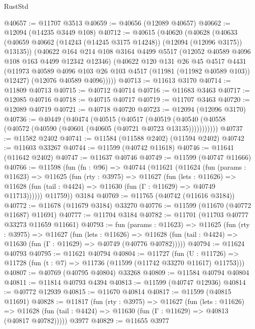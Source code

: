 \begin{lexlean}{RustStd}
\begin{coremodule}
@40657 := @11707 @3513
@40659 := @40656 (@12089 @40657)
@40662 := @12094 (@14235 @3449 @108)
@40712 := @40615
    (@40620
      (@40628
        (@40633 (@40659 @40662 (@14243 (@14245 @3175 @14248)) (@12094 (@12096 @3175)) @13135))
        (@40622
          @164
          @214
          @108
          @3164
          @4499
          @5517
          (@12052 @40589 @4096 @108 @163 @4499 @12342 @12346)
          (@40622
            @120
            @131
            @26
            @45
            @4517
            @4431
            (@11973 @40589 @4096 @103 @26 @103 @4517 (@11981 (@11982 @40589 @103)) @12427)
            (@12076 @40589 @4096)))))
@40713 := @11613 @3170
@40714 := @11809 @40713
@40715 := @40712 @40714
@40716 := @11683 @3463
@40717 := @12085 @40716
@40718 := @40715 @40717
@40719 := @11707 @3463
@40720 := @12089 @40719
@40721 := @40718 @40720
@40723 := @12094 (@12096 @3170)
@40736 := @40449
    (@40474
      (@40515
        (@40517
          (@40519 (@40540 (@40558 (@40572 (@40590 (@40601 (@40605 (@40721 @40723 @13135)))))))))))
@40737 := @11582 @2402
@40741 := @11584 (@11588 @2402) (@11594 @2402)
@40742 := @11603 @33267
@40744 := @11599 (@40742 @11618)
@40746 := @11641 (@11642 @2402)
@40747 := @11637 @40746
@40749 := @11599 (@40747 @11666)
@40766 := @11598
    (fun (fn : @96) =>
    @40744
      (@11621
        (@11624
          (fun (params : @11623) =>
          @11625
            (fun (rty : @3975) =>
            @11627
              (fun (lets : @11626) =>
              @11628 (fun (tail : @4424) => @11630 (fun (Γ : @11629) => @40749 @11713))))))
        @11759))
    @3184
@40769 := @11765 (@40742 (@11616 @3184))
@40772 := @11678 (@11679 @3184) @33270
@40776 := @11599 (@11670 (@40772 @11687) @11691)
@40777 := @11704 @3184
@40782 := @11701 (@11703 @40777 @33273 @11659 @11661)
@40793 := fun (params : @11623) =>
  @11625
    (fun (rty : @3975) =>
    @11627
      (fun (lets : @11626) =>
      @11628 (fun (tail : @4424) => @11630 (fun (Γ : @11629) => @40749 (@40776 @40782)))))
@40794 := @11624 @40793
@40795 := @11621 @40794
@40804 := @11727
    (fun (U : @11726) => @11728 (fun (t : @7) => @11736 (@11599 (@11742 @33270 @11617) @11753)))
@40807 := @40769 (@40795 @40804) @33268
@40809 := @11584 @40794 @40804
@40811 := @11814 @40793 @4394
@40813 := @11599 (@40747 @12936)
@40814 := @40772 @12939
@40815 := @11670 @40814
@40817 := @11599 (@40815 @11691)
@40828 := @11817
    (fun (rty : @3975) =>
    @11627
      (fun (lets : @11626) =>
      @11628 (fun (tail : @4424) => @11630 (fun (Γ : @11629) => @40813 (@40817 @40782)))))
    @3977
@40829 := @11655 @3977

\end{coremodule}
\end{lexlean}
